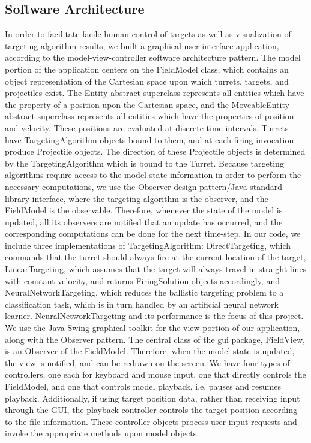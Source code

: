\documentclass[11pt,letterpaper]{article}
\begin{document}
\subsection{Software Architecture}
In order to facilitate facile human control of targets as well as visualization of targeting algorithm results, we built a graphical user interface application, according to the model-view-controller software architecture pattern. The model portion of the application centers on the FieldModel class, which contains an object representation of the Cartesian space upon which turrets, targets, and projectiles exist. The Entity abstract superclass represents all entities which have the property of a position upon the Cartesian space, and the MoveableEntity abstract superclass represents all entities which have the properties of position and velocity. These positions are evaluated at discrete time intervals.
Turrets have TargetingAlgorithm objects bound to them, and at each firing invocation produce Projectile objects. The direction of these Projectile objects is determined by the TargetingAlgorithm which is bound to the Turret. Because targeting algorithms require access to the model state information in order to perform the necessary computations, we use the Observer design pattern/Java standard library interface, where the targeting algorithm is the observer, and the FieldModel is the observable. Therefore, whenever the state of the model is updated, all its observers are notified that an update has occurred, and the corresponding computations can be done for the next time-step. In our code, we include three implementations of TargetingAlgorithm: DirectTargeting, which commands that the turret should always fire at the current location of the target, LinearTargeting, which assumes that the target will always travel in straight lines with constant velocity, and returns FiringSolution objects accordingly, and NeuralNetworkTargeting, which reduces the ballistic targeting problem to a classification task, which is in turn handled by an artificial neural network learner. NeuralNetworkTargeting and its performance is the focus of this project.
We use the Java Swing graphical toolkit for the view portion of our application, along with the Observer pattern. The central class of the gui package, FieldView, is an Observer of the FieldModel. Therefore, when the model state is updated, the view is notified, and can be redrawn on the screen.
We have four types of controllers, one each for keyboard and mouse input, one that directly controls the FieldModel, and one that controls model playback, i.e. pauses and resumes playback. Additionally, if using target position data, rather than receiving input through the GUI, the playback controller controls the target position according to the file information. These controller objects process user input requests and invoke the appropriate methods upon model objects.
\end{document}
